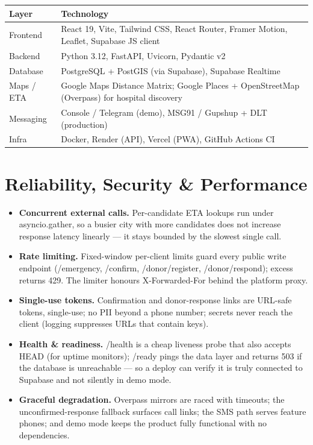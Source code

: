 \documentclass[11pt]{article}
\newcommand{\code}[1]{\colorbox{ghCodeBg}{\ttfamily\small #1}}
\begin{document}
\begin{center}
\begin{tabularx}{\textwidth}{@{}p{3.2cm} L@{}}
\toprule
\textbf{Layer} & \textbf{Technology} \\
\midrule
Frontend & React 19, Vite, Tailwind CSS, React Router, Framer Motion, Leaflet, Supabase JS client \\
Backend & Python 3.12, FastAPI, Uvicorn, Pydantic v2 \\
Database & PostgreSQL + PostGIS (via Supabase), Supabase Realtime \\
Maps / ETA & Google Maps Distance Matrix; Google Places + OpenStreetMap (Overpass) for hospital discovery \\
Messaging & Console / Telegram (demo), MSG91 / Gupshup + DLT (production) \\
Infra & Docker, Render (API), Vercel (PWA), GitHub Actions CI \\
\bottomrule
\end{tabularx}
\end{center}

\section{Reliability, Security \& Performance}\label{sec:perf}

\begin{itemize}
  \item \textbf{Concurrent external calls.} Per-candidate ETA lookups run under
  \code{asyncio.gather}, so a busier city with more candidates does not increase
  response latency linearly --- it stays bounded by the slowest single call.
  \item \textbf{Rate limiting.} Fixed-window per-client limits guard every public
  write endpoint (\code{/emergency}, \code{/confirm}, \code{/donor/register},
  \code{/donor/respond}); excess returns \code{429}. The limiter honours
  \code{X-Forwarded-For} behind the platform proxy.
  \item \textbf{Single-use tokens.} Confirmation and donor-response links are
  URL-safe tokens, single-use; no PII beyond a phone number; secrets never reach
  the client (logging suppresses URLs that contain keys).
  \item \textbf{Health \& readiness.} \code{/health} is a cheap liveness probe that
  also accepts \code{HEAD} (for uptime monitors); \code{/ready} pings the data layer
  and returns \code{503} if the database is unreachable --- so a deploy can verify it
  is truly connected to Supabase and not silently in demo mode.
  \item \textbf{Graceful degradation.} Overpass mirrors are raced with timeouts; the
  unconfirmed-response fallback surfaces call links; the SMS path serves feature
  phones; and demo mode keeps the product fully functional with no dependencies.
\end{itemize}
\end{document}
